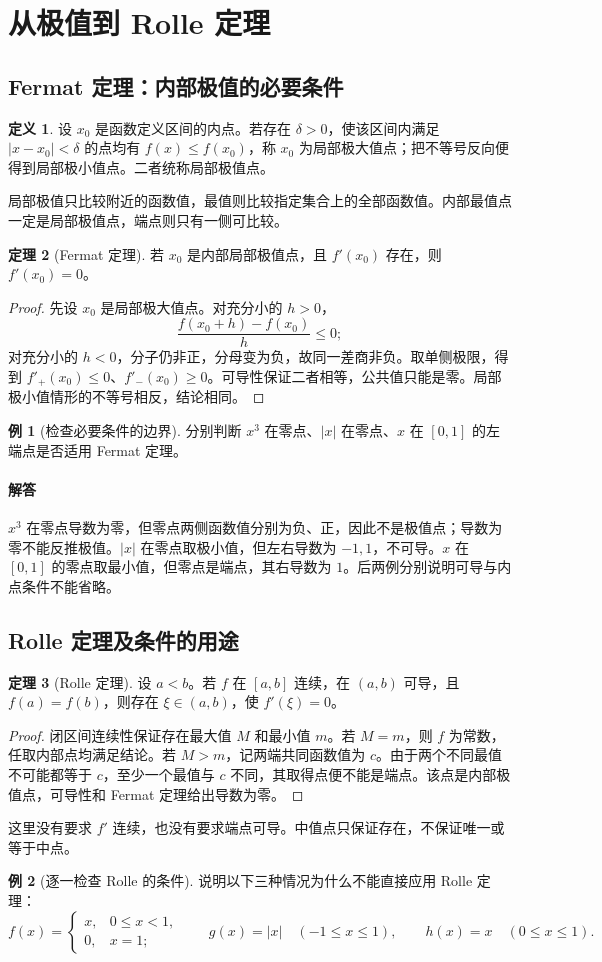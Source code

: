 \documentclass[UTF8,fontset=fandol,12pt,oneside,openany]{ctexrep}
\theoremstyle{definition}
\newtheorem{theorem}{定理}[chapter]
\newtheorem{definition}[theorem]{定义}
\newtheorem{example}{例}[chapter]
\begin{document}
\section{从极值到 Rolle 定理}
\subsection{Fermat 定理：内部极值的必要条件}
\begin{definition}
设 $x_0$ 是函数定义区间的内点。若存在 $\delta>0$，使该区间内满足 $|x-x_0|<\delta$ 的点均有 $f(x)\le f(x_0)$，称 $x_0$ 为局部极大值点；把不等号反向便得到局部极小值点。二者统称局部极值点。
\end{definition}
局部极值只比较附近的函数值，最值则比较指定集合上的全部函数值。内部最值点一定是局部极值点，端点则只有一侧可比较。
\begin{theorem}[Fermat 定理]
若 $x_0$ 是内部局部极值点，且 $f'(x_0)$ 存在，则 $f'(x_0)=0$。
\end{theorem}
\begin{proof}
先设 $x_0$ 是局部极大值点。对充分小的 $h>0$，
\[
\frac{f(x_0+h)-f(x_0)}h\le0;
\]
对充分小的 $h<0$，分子仍非正，分母变为负，故同一差商非负。取单侧极限，得到 $f'_+(x_0)\le0$、$f'_-(x_0)\ge0$。可导性保证二者相等，公共值只能是零。局部极小值情形的不等号相反，结论相同。
\end{proof}
\begin{example}[检查必要条件的边界]
分别判断 $x^3$ 在零点、$|x|$ 在零点、$x$ 在 $[0,1]$ 的左端点是否适用 Fermat 定理。
\end{example}
\paragraph{解答}
$x^3$ 在零点导数为零，但零点两侧函数值分别为负、正，因此不是极值点；导数为零不能反推极值。$|x|$ 在零点取极小值，但左右导数为 $-1,1$，不可导。$x$ 在 $[0,1]$ 的零点取最小值，但零点是端点，其右导数为 $1$。后两例分别说明可导与内点条件不能省略。

\subsection{Rolle 定理及条件的用途}
\begin{theorem}[Rolle 定理]\label{lec:06:rolle}
设 $a<b$。若 $f$ 在 $[a,b]$ 连续，在 $(a,b)$ 可导，且 $f(a)=f(b)$，则存在 $\xi\in(a,b)$，使 $f'(\xi)=0$。
\end{theorem}
\begin{proof}
闭区间连续性保证存在最大值 $M$ 和最小值 $m$。若 $M=m$，则 $f$ 为常数，任取内部点均满足结论。若 $M>m$，记两端共同函数值为 $c$。由于两个不同最值不可能都等于 $c$，至少一个最值与 $c$ 不同，其取得点便不能是端点。该点是内部极值点，可导性和 Fermat 定理给出导数为零。
\end{proof}
这里没有要求 $f'$ 连续，也没有要求端点可导。中值点只保证存在，不保证唯一或等于中点。
\begin{example}[逐一检查 Rolle 的条件]
说明以下三种情况为什么不能直接应用 Rolle 定理：
\[
f(x)=\begin{cases}x,&0\le x<1,\\0,&x=1;\end{cases}
\qquad g(x)=|x|\quad(-1\le x\le1),\qquad h(x)=x\quad(0\le x\le1).
\]
\end{example}
\end{document}
